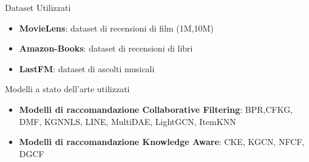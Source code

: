 \begin{frame}{Dataset Utilizzati}
    \begin{itemize}
        \item \textbf{MovieLens}: dataset di recensioni di film (1M,10M)
        \item \textbf{Amazon-Books}: dataset di recensioni di libri
        \item \textbf{LastFM}: dataset di ascolti musicali
    \end{itemize}
\end{frame}

\begin{frame}{Modelli a stato dell'arte utilizzati}
    \begin{itemize}
        \item \textbf{Modelli di raccomandazione Collaborative Filtering}: BPR,CFKG, DMF, KGNNLS, LINE, MultiDAE, LightGCN, ItemKNN
        \item \textbf{Modelli di raccomandazione Knowledge Aware}: CKE, KGCN, NFCF, DGCF
    \end{itemize}
\end{frame}
